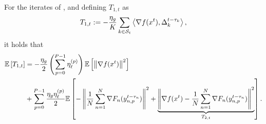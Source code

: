 \begin{lemma} \label{lemma:expected-t1}
    For the iterates of \algname{}, and defining $T_{1,t}$ as
    $$T_{1,t} := -\frac{\eta_g}{K}\sum_{k\in \mathcal{S}_t} \left\langle\nabla f(x^t),  \Delta_{k}^{t-\tau_k} \right\rangle,$$
    it holds that
    \begin{equation}
        \begin{aligned}
            \mathbb{E}\left[T_{1,t}\right]
             & = -\frac{\eta_g}{2} \left(\sum_{p=0}^{P-1} \eta^{(p)}_{\ell} \right)\mathbb{E}\left[\left\lVert\nabla f(x^t)\right\rVert^2\right]                                                                                                                                             \\
             & + \sum_{p=0}^{P-1} \frac{ \eta_g \eta^{(p)}_{\ell}}{2} \mathbb{E}\left[- \left\lVert\frac{1}{N}\sum_{n = 1}^N \nabla F_n(y^{t-\tau_n}_{n,p})\right\rVert^2 + \underbrace{\left\lVert\nabla f(x^t) - \frac{1}{N}\sum_{n = 1}^N \nabla F_n(y^{t-\tau_n}_{n,p})\right\rVert^2}_{T_{2,t}}\right].
        \end{aligned}
    \end{equation}
\end{lemma}
